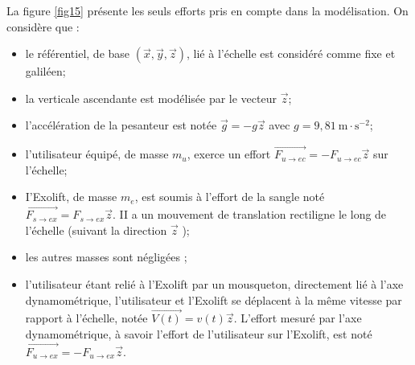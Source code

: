 La figure \ref{fig15} présente les seuls efforts pris en compte dans la modélisation. On considère que :

\begin{itemize}
  \item le référentiel, de base $(\vec{x}, \vec{y}, \vec{z})$, lié à l'échelle est considéré comme fixe et galiléen;

  \item la verticale ascendante est modélisée par le vecteur $\vec{z}$;

  \item l'accélération de la pesanteur est notée $\vec{g}=-g \vec{z}$ avec $g=9,81 \mathrm{~m} \cdot \mathrm{s}^{-2}$;

  \item l'utilisateur équipé, de masse $m_{u}$, exerce un effort $\overrightarrow{F_{u \rightarrow e c}}=-F_{u \rightarrow e c} \vec{z}$ sur l'échelle;

  \item I'Exolift, de masse $m_{e}$, est soumis à l'effort de la sangle noté $\overrightarrow{F_{s \rightarrow e x}}=F_{s \rightarrow e x} \vec{z}$. II a un mouvement de translation rectiligne le long de l'échelle (suivant la direction $\vec{z}$ );
  
  \item les autres masses sont négligées ;

  \item l'utilisateur étant relié à l'Exolift par un mousqueton, directement lié à l'axe dynamométrique, l'utilisateur et l'Exolift se déplacent à la même vitesse par rapport à l'échelle, notée $\overrightarrow{V(t)}=v(t) \vec{z}$. L'effort mesuré par l'axe dynamométrique, à savoir l'effort de l'utilisateur sur l'Exolift, est noté $\overrightarrow{F_{u \rightarrow e x}}=-F_{u \rightarrow e x} \vec{z}$.

\end{itemize}



\fi


